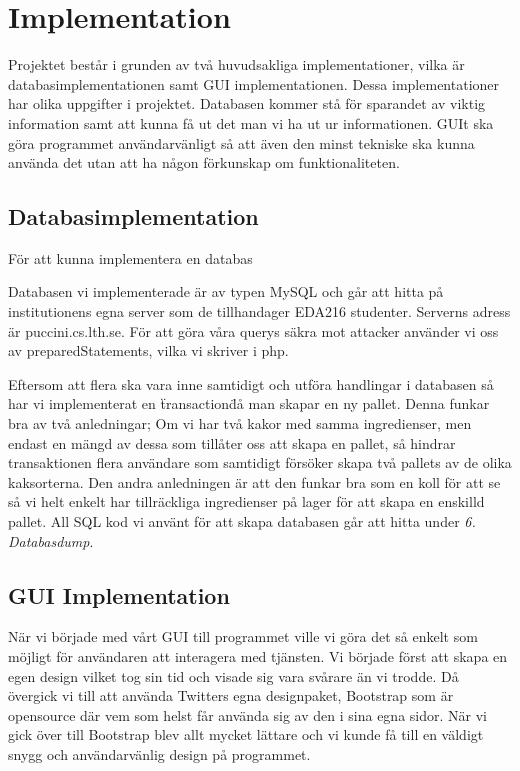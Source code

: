 \section{Implementation}

Projektet består i grunden av två huvudsakliga implementationer, vilka är databasimplementationen samt GUI implementationen. Dessa implementationer har olika uppgifter i projektet. Databasen kommer stå för sparandet av viktig information samt att kunna få ut det man vi ha ut ur informationen. GUIt ska göra programmet användarvänligt så att även den minst tekniske ska kunna använda det utan att ha någon förkunskap om funktionaliteten.

\subsection{Databasimplementation}

För att kunna implementera en databas

Databasen vi implementerade är av typen MySQL och går att hitta på institutionens egna server som de tillhandager EDA216 studenter. Serverns adress är puccini.cs.lth.se. För att göra våra querys säkra mot attacker använder vi oss av preparedStatements, vilka vi skriver i php. 

Eftersom att flera ska vara inne samtidigt och utföra handlingar i databasen så har vi implementerat en \"transaction\" då man skapar en ny pallet. Denna funkar bra av två anledningar; Om vi har två kakor med samma ingredienser, men endast en mängd av dessa som tillåter oss att skapa en pallet, så hindrar transaktionen flera användare som samtidigt försöker skapa två pallets av de olika kaksorterna. Den andra anledningen är att den funkar bra som en koll för att se så vi helt enkelt har tillräckliga ingredienser på lager för att skapa en enskilld pallet. All SQL kod vi använt för att skapa databasen går att hitta under \emph{6. Databasdump}.

\subsection{GUI Implementation}

När vi började med vårt GUI till programmet ville vi göra det så enkelt som möjligt för användaren att interagera med tjänsten. Vi började först att skapa en egen design vilket tog sin tid och visade sig vara svårare än vi trodde. Då övergick vi till att använda Twitters egna designpaket, Bootstrap som är opensource där vem som helst får använda sig av den i sina egna sidor. När vi gick över till Bootstrap blev allt mycket lättare och vi kunde få till en väldigt snygg och användarvänlig design på programmet.

